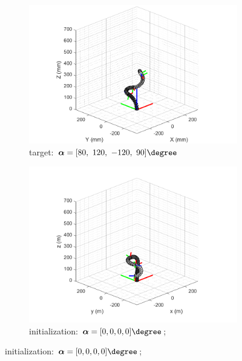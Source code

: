 \begin{figure}[H] %
    \centering 
    \captionsetup{labelsep=colon}
    \begin{subfigure}{0.9\textwidth} %
        \centering
        \includegraphics[width=\linewidth]{Image/MATLAB/manipulator_80_120_-120_90.png}
        \caption{\centering target: $\boldsymbol{\alpha} = [80,\ 120,\ -120,\ 90] \degree$ \\ \qquad}
        \label{fig:complex_target}
    \end{subfigure}
    \begin{subfigure}{0.49\textwidth} %
        \centering
        \includegraphics[width=\linewidth]{Image/MATLAB/manipulator_-8.88_-89.99_-126.81_-169.73.png}
        \caption{\centering initialization: $\boldsymbol{\alpha} = [0, 0, 0, 0]\degree$; \\
}
\end{subfigure}
\end{figure}
